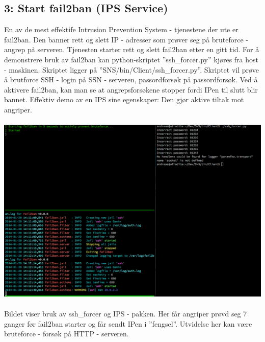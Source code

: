 \documentclass{article}
\begin{document}
\subsection{3: Start fail2ban (IPS Service)}
En av de mest effektife Intrusion Prevention System - tjenestene der ute er fail2ban. Den banner rett og slett IP - adresser som prøver seg på bruteforce - angrep på serveren. Tjenesten starter rett og slett fail2ban etter en gitt tid. For å demonstrere bruk av fail2ban kan python-skriptet ''ssh\_forcer.py'' kjøres fra host - maskinen. Skriptet ligger på ''SNS/bin/Client/ssh\_forcer.py''. Skriptet vil prøve å brutforce SSH - login på SSN - serveren, passordforsøk på passordforsøk. Ved å aktivere fail2ban, kan man se at angrepsforsøkene stopper fordi IPen til slutt blir bannet. Effektiv demo av en IPS sine egenskaper: Den gjør aktive tiltak mot angriper.
\\ \\
\includegraphics[scale = 0.5]{ips.png}
\\ \\
Bildet viser bruk av ssh\_forcer og IPS - pakken. Her får angriper prøvd seg 7 ganger før fail2ban starter og får sendt IPen i ''fengsel''. Utvidelse her kan være bruteforce - forsøk på HTTP - serveren. 
\end{document}

